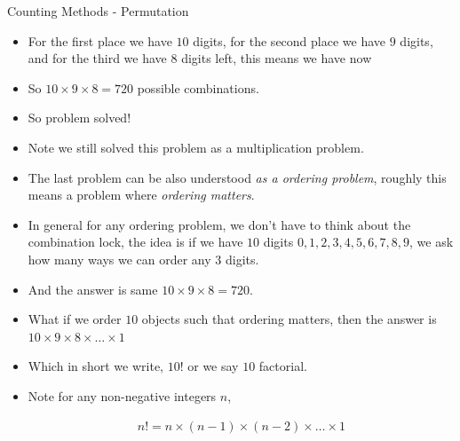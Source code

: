 \documentclass[8pt,usepdftitle=false]{beamer}
\begin{document}
\begin{frame}[allowframebreaks]{Counting Methods - Permutation}
\begin{itemize}
\item For the first place we have $10$ digits, for the second place we have $9$ digits, and for the third we have $8$ digits left, this means we have now

\vspace*{.3cm}
\begin{figure}
\centering
{}
\end{figure}
\vspace*{.3cm}


\item So $10 \times 9 \times 8 = 720$ possible combinations.

\item So problem solved! 

\item Note we still solved this problem as a multiplication problem.

\framebreak

\item The last problem can be also understood \emph{as a ordering problem}, roughly this means a problem where \emph{ordering matters}.


\item In general for any ordering problem, we don't have to think about the combination lock, the idea is if we have $10$ digits $0, 1, 2, 3, 4, 5, 6, 7, 8, 9$, we ask \alert{how many ways we can order any $3$ digits}. 


\item And the answer is same $10 \times 9 \times 8 = 720$.

\item What if we order $10$ objects such that ordering matters, then the answer is $10 \times 9 \times 8 \times \ldots \times 1$

\item Which in short we write, $10!$ or we say \alert{$10$ factorial}.

\item Note for any non-negative integers $n$,

\begin{align*}
n! = n \times (n-1) \times (n-2) \times \ldots \times 1
\end{align*}



\end{itemize}
\end{frame}
\end{document}
